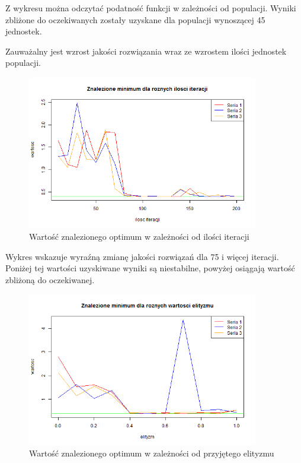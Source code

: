 \documentclass[11pt, a4paper]{article}
\newcommand{\fbi}{\leavevmode{\parindent=1em\indent}}
\begin{document}
\fbi
Z wykresu można odczytać podatność funkcji w zależności od populacji. Wyniki zbliżone do oczekiwanych zostały uzyskane dla populacji wynoszącej 45 jednostek.

\fbi
Zauważalny jest wzrost jakości rozwiązania wraz ze wzrostem ilości jednostek populacji.


\begin{figure}[H]
	\centering
	\includegraphics[width=0.9\textwidth]{./assets/Branin5.png} %
	\caption{Wartość znalezionego optimum w zależności od ilości iteracji}
	\label{fig:branin5}
\end{figure}

\fbi
Wykres wskazuje wyraźną zmianę jakości rozwiązań dla 75 i więcej iteracji. Poniżej tej wartości uzyskiwane wyniki są niestabilne, powyżej osiągają wartość zbliżoną do oczekiwanej.

\begin{figure}[H]
	\centering
	\includegraphics[width=0.9\textwidth]{./assets/Branin6.png}
	\caption{Wartość znalezionego optimum w zależności od przyjętego elityzmu}
	\label{fig:branin6}
\end{figure}
\end{document}
